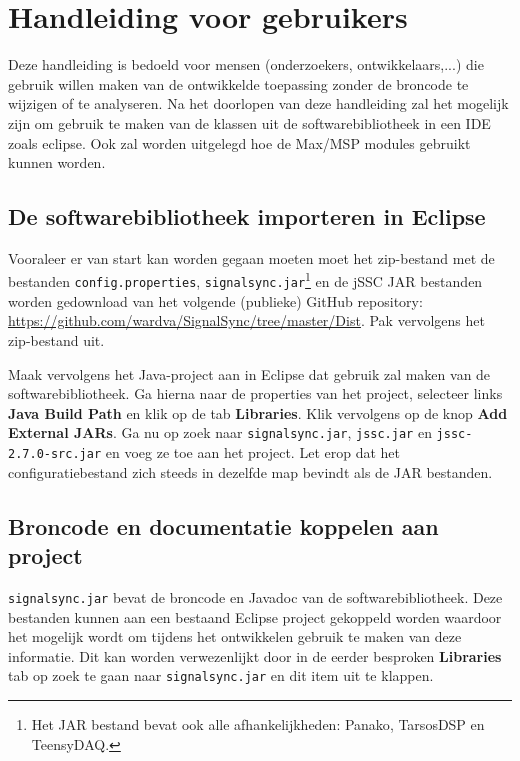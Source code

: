 \chapter{Handleiding voor gebruikers}
\label{appendix-d}

Deze handleiding is bedoeld voor mensen (onderzoekers, ontwikkelaars,...) die gebruik willen maken van de ontwikkelde toepassing zonder de broncode te wijzigen of te analyseren. Na het doorlopen van deze handleiding zal het mogelijk zijn om gebruik te maken van de klassen uit de softwarebibliotheek in een IDE zoals eclipse. Ook zal worden uitgelegd hoe de Max/MSP modules gebruikt kunnen worden.

\section*{De softwarebibliotheek importeren in Eclipse}

Vooraleer er van start kan worden gegaan moeten moet het zip-bestand met de bestanden \texttt{config.properties}, \texttt{signalsync.jar}\footnote{Het JAR bestand bevat ook alle afhankelijkheden: Panako\cite{six2014panako}, TarsosDSP\cite{six2014tarsosdsp} en TeensyDAQ.} en de jSSC JAR bestanden worden gedownload van het volgende (publieke) GitHub repository:
\url{https://github.com/wardva/SignalSync/tree/master/Dist}. Pak vervolgens het zip-bestand uit.

Maak vervolgens het Java-project aan in Eclipse dat gebruik zal maken van de softwarebibliotheek. Ga hierna naar de properties van het project, selecteer links \textbf{Java Build Path} en klik op de tab \textbf{Libraries}. Klik vervolgens op de knop \textbf{Add External JARs}. Ga nu op zoek naar \texttt{signalsync.jar}, \texttt{jssc.jar} en \texttt{jssc-2.7.0-src.jar} en voeg ze toe aan het project. Let erop dat het configuratiebestand zich steeds in dezelfde map bevindt als de JAR bestanden.

\section*{Broncode en documentatie koppelen aan project}

\texttt{signalsync.jar} bevat de broncode en Javadoc van de softwarebibliotheek. Deze bestanden kunnen aan een bestaand Eclipse project gekoppeld worden waardoor het mogelijk wordt om tijdens het ontwikkelen gebruik te maken van deze informatie. Dit kan worden verwezenlijkt door in de eerder besproken \textbf{Libraries} tab op zoek te gaan naar \texttt{signalsync.jar} en dit item uit te klappen. 


